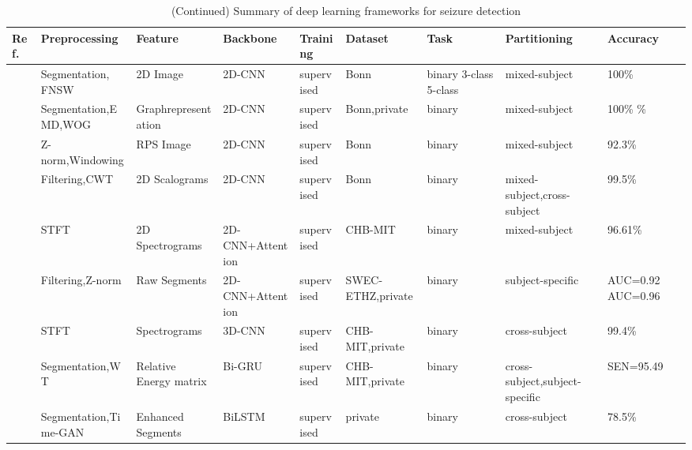 \begin{table*}[ht]
\renewcommand{\arraystretch}{1.2}
\caption*{(Continued) Summary of deep learning frameworks for seizure detection}
\footnotesize
\begin{tabular}{p{0.4cm}p{2.8cm}p{2cm}p{1.5cm}p{1.9cm}p{1.9cm}p{0.8cm}p{1.8cm}p{1.5cm}}
\hline
\textbf{Ref.} & \textbf{Preprocessing} & \textbf{Feature} & \textbf{Backbone} & \textbf{Training} & \textbf{Dataset} & \textbf{Task} & \textbf{Partitioning} & \textbf{Accuracy} \\
\hline
 ~\cite{Seizure34} & Segmentation,
FNSW & 2D Image & 2D-CNN & supervised & Bonn & binary
3-class
5-class & mixed-subject & 100\% \\
~\cite{Seizure35} & Segmentation,EMD,WOG & Graph\newline  representation & 2D-CNN & supervised & Bonn,\newline private & binary & mixed-subject & 100\% \newline
97.65\% \\
~\cite{Seizure36} & Z-norm,Windowing & RPS Image & 2D-CNN & supervised & Bonn & binary & mixed-subject & 92.3\% \\
~\cite{Seizure37} & Filtering,CWT & 2D Scalograms & 2D-CNN & supervised & Bonn & binary & mixed-subject,\newline cross-subject & 99.5\% \\
 ~\cite{yuan2018novel} & STFT & 2D Spectrograms & 2D-CNN\newline +Attention & supervised & CHB-MIT & binary & mixed-subject & 96.61\% \\
~\cite{Seizure39} & Filtering,Z-norm & Raw Segments & 2D-CNN\newline +Attention & supervised & SWEC-ETHZ,private & binary & subject-specific & AUC=0.92
AUC=0.96 \\
~\cite{choi2019novel} & STFT & Spectrograms & 3D-CNN & supervised & CHB-MIT,\newline private & binary & cross-subject & 99.4\% \\
~\cite{zhang2022epileptic} & Segmentation,WT & Relative Energy matrix & Bi-GRU & supervised & CHB-MIT,\newline private & binary & cross-subject,\newline subject-specific & SEN=95.49 \\
~\cite{Seizure42} & Segmentation,\newline Time-GAN & Enhanced Segments & BiLSTM & supervised & private & binary & cross-subject & 78.5\% \\

\end{tabular}
\end{table*}
